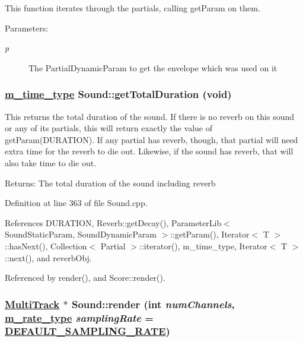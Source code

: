 This function iterates through the partials, calling get\-Param on them. \begin{Desc}
\item[Parameters:]
\begin{description}
\item[{\em p}]The Partial\-Dynamic\-Param to get the envelope which was used on it \end{description}
\end{Desc}
\hypertarget{classSound_a11}{
\subsubsection[getTotalDuration]{\setlength{\rightskip}{0pt plus 5cm}\hyperlink{Types_8h_a2}{m\_\-time\_\-type} Sound::get\-Total\-Duration (void)}}
\label{classSound_a11}


This returns the total duration of the sound. If there is no reverb on this sound or any of its partials, this will return exactly the value of get\-Param(DURATION). If any partial has reverb, though, that partial will need extra time for the reverb to die out. Likewise, if the sound has reverb, that will also take time to die out. \begin{Desc}
\item[Returns:]The total duration of the sound including reverb \end{Desc}


Definition at line 363 of file Sound.cpp.

References DURATION, Reverb::get\-Decay(), Parameter\-Lib$<$ Sound\-Static\-Param, Sound\-Dynamic\-Param $>$::get\-Param(), Iterator$<$ T $>$::has\-Next(), Collection$<$ Partial $>$::iterator(), m\_\-time\_\-type, Iterator$<$ T $>$::next(), and reverb\-Obj.

Referenced by render(), and Score::render().\hypertarget{classSound_a6}{
\subsubsection[render]{\setlength{\rightskip}{0pt plus 5cm}\hyperlink{classMultiTrack}{Multi\-Track} $\ast$ Sound::render (int {\em num\-Channels}, \hyperlink{Types_8h_a4}{m\_\-rate\_\-type} {\em sampling\-Rate} = \hyperlink{Types_8h_a5}{DEFAULT\_\-SAMPLING\_\-RATE})}}
\label{classSound_a6}


